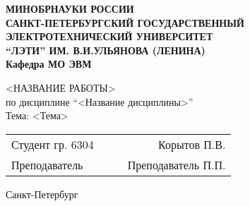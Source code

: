 \begin{titlepage}
    \centering
    {\bfseries
        \uppercase{
            Минобрнауки России \\
            Санкт-Петербургский государственный \\
            Электротехнический университет \\
            \enquote{ЛЭТИ} им. В.И.Ульянова (Ленина)\\
        }
        Кафедра МО ЭВМ

        \vspace{\fill}
        \uppercase{<Название работы>} \\
        по дисциплине \enquote{<Название дисциплины>} \\
        Тема: <Тема>
    }

    \vspace{\fill}
    \begin{tabularx}{0.8\textwidth}{l X c r}
        Студент гр. 6304 & & \underline{\hspace{3cm}} & Корытов П.В.\\
        Преподаватель & & \underline{\hspace{3cm}} & Преподаватель П.П. 
    \end{tabularx}

    \vspace{1cm}
    Санкт-Петербург \\
    \the\year{}
\end{titlepage}
